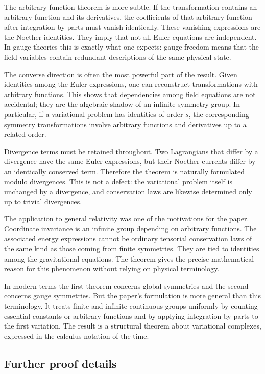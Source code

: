 \documentclass[11pt]{article}
\begin{document}
The arbitrary-function theorem is more subtle. If the transformation contains an arbitrary function
and its derivatives, the coefficients of that arbitrary function after integration by parts must
vanish identically. These vanishing expressions are the Noether identities. They imply that not all
Euler equations are independent. In gauge theories this is exactly what one expects: gauge freedom
means that the field variables contain redundant descriptions of the same physical state.

The converse direction is often the most powerful part of the result. Given identities among the
Euler expressions, one can reconstruct transformations with arbitrary functions. This shows that
dependencies among field equations are not accidental; they are the algebraic shadow of an infinite
symmetry group. In particular, if a variational problem has identities of order \(s\), the
corresponding symmetry transformations involve arbitrary functions and derivatives up to a related
order.

Divergence terms must be retained throughout. Two Lagrangians that differ by a divergence have the
same Euler expressions, but their Noether currents differ by an identically conserved term.
Therefore the theorem is naturally formulated modulo divergences. This is not a defect: the
variational problem itself is unchanged by a divergence, and conservation laws are likewise
determined only up to trivial divergences.

The application to general relativity was one of the motivations for the paper. Coordinate
invariance is an infinite group depending on arbitrary functions. The associated energy expressions
cannot be ordinary tensorial conservation laws of the same kind as those coming from finite
symmetries. They are tied to identities among the gravitational equations. The theorem gives the
precise mathematical reason for this phenomenon without relying on physical terminology.

In modern terms the first theorem concerns global symmetries and the second concerns gauge
symmetries. But the paper's formulation is more general than this terminology. It treats finite and
infinite continuous groups uniformly by counting essential constants or arbitrary functions and by
applying integration by parts to the first variation. The result is a structural theorem about
variational complexes, expressed in the calculus notation of the time.


\subsection{Further proof details}
\end{document}

